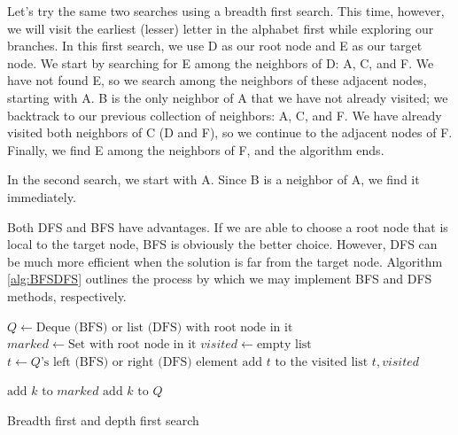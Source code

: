 Let's try the same two searches using a breadth first search. This time, however,
we will visit the earliest (lesser) letter in the alphabet first while
exploring our branches. In this first search, we use D as our root node and
E as our target node.
We start by searching for E among the neighbors of D: A, C, and F.
We have not found E, so we search among the neighbors of these adjacent nodes, starting with A.
B is the only neighbor of A that we have not already visited; we backtrack to our previous collection of neighbors: A, C, and F.
We have already visited both neighbors of C (D and F), so we continue to the adjacent nodes of F. Finally, we find E among the neighbors of F, and the algorithm ends.

In the second search, we start with A.
Since B is a neighbor of A, we find it immediately.

Both DFS and BFS have advantages.
If we are able to choose a root node that is local to the target node, BFS is obviously the better choice. However,
DFS can be much more efficient when the solution is far from the target node.
Algorithm \ref{alg:BFSDFS} outlines the process by which we may implement BFS and DFS methods, respectively.

\begin{algorithm}
\begin{algorithmic}[1]
	\State $Q \gets \text{Deque (BFS) or list (DFS) with root node in it}$	
	\State $marked \gets \text{Set with root node in it}$	
	\State $visited \gets \text{empty list}$	
							
		\State $t \gets Q\text{'s left (BFS) or right (DFS) element}$	
		\State $\text{add }t \text{ to the visited list}$
									
			\State {} $t,visited$
		
		\Else										{}
					\State $\text{add } k \text{ to } marked$
					\State $\text{add } k \text{ to } Q$
				\EndIf
			\EndFor
		\EndIf
	\EndWhile
\EndProcedure
\end{algorithmic}
\caption{Breadth first and depth first search}
\label{alg:BFSDFS}
\end{algorithm}

